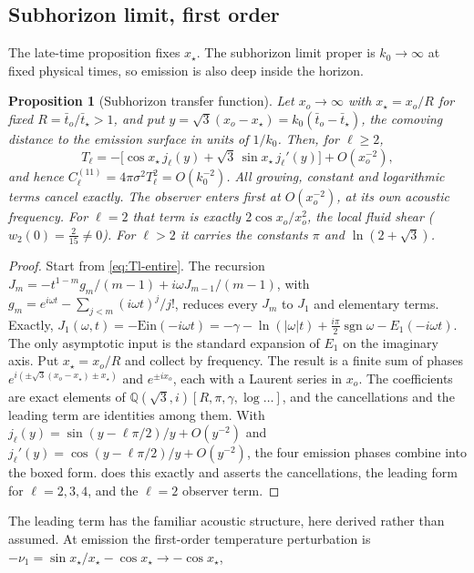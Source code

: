 \documentclass[11pt]{article}
\newtheorem{proposition}[theorem]{Proposition}
\theoremstyle{definition}
\theoremstyle{remark}
\begin{document}
\subsection{Subhorizon limit, first order}\label{sec:subhorizon-first}
The late-time proposition fixes $x_\star$. The subhorizon limit proper is $k_0\to\infty$ at
fixed physical times, so emission is also deep inside the horizon.

\begin{proposition}[Subhorizon transfer function]\label{prop:subhorizon}
Let $x_o\to\infty$ with $x_\star=x_o/R$ for fixed $R=\bar t_o/\bar t_\star>1$, and put
$y=\sqrt3(x_o-x_\star)=k_0(\bar t_o-\bar t_\star)$, the comoving distance to the emission
surface in units of $1/k_0$. Then, for $\ell\ge2$,
\[
\boxed{T_\ell=-\big[\cos x_\star\,j_\ell(y)+\sqrt3\,\sin x_\star\,j_\ell'(y)\big]+O(x_o^{-2}),}
\]
and hence $C^{(11)}_\ell=4\pi\sigma^2T_\ell^2=O(k_0^{-2})$. All growing, constant and
logarithmic terms cancel exactly. The observer enters first at $O(x_o^{-2})$, at its own
acoustic frequency. For $\ell=2$ that term is exactly $2\cos x_o/x_o^2$, the local fluid shear
($w_2(0)=\frac2{15}\neq0$). For $\ell>2$ it carries the constants $\pi$ and $\ln(2+\sqrt3)$.
\end{proposition}
\begin{proof}
Start from \eqref{eq:Tl-entire}. The recursion
$J_m=-t^{1-m}g_m/(m-1)+i\omega J_{m-1}/(m-1)$, with $g_m=e^{i\omega t}-\sum_{j<m}(i\omega t)^j/j!$,
reduces every $J_m$ to $J_1$ and elementary terms. Exactly,
$J_1(\omega,t)=-\mathrm{Ein}(-i\omega t)=-\gamma-\ln(|\omega|t)+\frac{i\pi}2\operatorname{sgn}\omega-E_1(-i\omega t)$.
The only asymptotic input is the standard expansion of $E_1$ on the imaginary axis. Put
$x_\star=x_o/R$ and collect by frequency. The result is a finite sum of phases
$e^{i(\pm\sqrt3(x_o-x_\star)\pm x_\star)}$ and $e^{\pm ix_o}$, each with a Laurent series in $x_o$.
The coefficients are exact elements of $\mathbb Q(\sqrt3,i)[R,\pi,\gamma,\log\ldots]$, and the
cancellations and the leading term are identities among them. With
$j_\ell(y)=\sin(y-\ell\pi/2)/y+O(y^{-2})$ and $j_\ell'(y)=\cos(y-\ell\pi/2)/y+O(y^{-2})$, the
four emission phases combine into the boxed form.
 does this exactly and asserts the cancellations, the
leading form for $\ell=2,3,4$, and the $\ell=2$ observer term.
\end{proof}
The leading term has the familiar acoustic structure, here derived rather than assumed. At
emission the first-order temperature perturbation is $-\nu_1=\sin x_\star/x_\star-\cos x_\star\to-\cos x_\star$,
\end{document}
